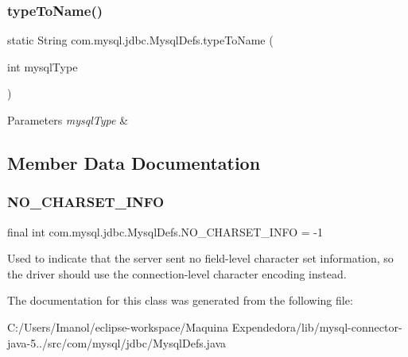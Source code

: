 \subsubsection{\texorpdfstring{type\+To\+Name()}{typeToName()}}
{\footnotesize\ttfamily static String com.\+mysql.\+jdbc.\+Mysql\+Defs.\+type\+To\+Name (\begin{DoxyParamCaption}\item[{int}]{mysql\+Type }\end{DoxyParamCaption})\hspace{0.3cm}{\ttfamily [static]}}


\begin{DoxyParams}{Parameters}
{\em mysql\+Type} & \\
\hline
\end{DoxyParams}


\subsection{Member Data Documentation}
\mbox{\label{classcom_1_1mysql_1_1jdbc_1_1_mysql_defs_a57ecf71e2bc25b5a02f82e1c55d6c3d0}} 
\subsubsection{\texorpdfstring{N\+O\+\_\+\+C\+H\+A\+R\+S\+E\+T\+\_\+\+I\+N\+FO}{NO\_CHARSET\_INFO}}
{\footnotesize\ttfamily final int com.\+mysql.\+jdbc.\+Mysql\+Defs.\+N\+O\+\_\+\+C\+H\+A\+R\+S\+E\+T\+\_\+\+I\+N\+FO = -\/1\hspace{0.3cm}{\ttfamily [static]}}

Used to indicate that the server sent no field-\/level character set information, so the driver should use the connection-\/level character encoding instead. 

The documentation for this class was generated from the following file\+:\begin{DoxyCompactItemize}
\item 
C\+:/\+Users/\+Imanol/eclipse-\/workspace/\+Maquina Expendedora/lib/mysql-\/connector-\/java-\/5../src/com/mysql/jdbc/Mysql\+Defs.\+java\end{DoxyCompactItemize}

